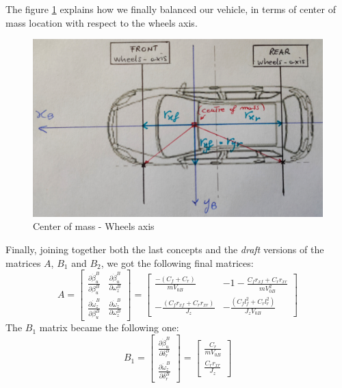 	The figure \ref{VehicleScheme} explains how we finally balanced our vehicle, in terms of center of mass location with respect to the wheels axis.
	\begin{figure} 
		\centering
		\includegraphics[scale=0.1]{../Images/LinSyst/SchemaAssi}
		\caption{Center of mass - Wheels axis}
		\label{VehicleScheme}
	\end{figure}
\newpage
	Finally, joining together both the last concepts and the \textit{draft} versions of the matrices $A$, $B_{1}$ and $B_{2}$, we got the following final matrices:
\begin{equation}
	A=
	\begin{bmatrix}
		\frac{\partial\dot{\beta}_{u}^{B}}{\partial\beta_{u}^{B}} & \frac{\partial\dot{\beta}_{u}^{B}}{\partial\omega_{z}^{B}} \\
		\frac{\partial\dot{\omega}_{z}^{B}}{\partial\beta_{u}^{B}} & \frac{\partial\dot{\omega}_{z}^{B}}{\partial\omega_{z}^{B}}
	\end{bmatrix} = 
	\begin{bmatrix}
		\frac{-(C_{f} + C_{r})}{mV_{0B}} & -1 -\frac{C_{f}r_{xf} + C_{r}r_{xr}}{m V_{0B}^{2}} \\ 
		-\frac{(C_{f}r_{xf} + C_{r}r_{xr})}{J_{z}} & -\frac{(C_{f}l_{f}^{2} + C_{r}l_{r}^{2})}{J_{z} V_{0B}}
	\end{bmatrix}
\end{equation}
The $B_{1}$ matrix became the following one:
\begin{equation} 
B_{1}=
\begin{bmatrix} 
\frac{\partial\dot{\beta}_{u}^{B}}{\partial\delta_{r}^{B}} \\
\frac{\partial\dot{\omega}_{z}^{B}}{\partial\delta_{r}^{B}}
\end{bmatrix} =
\begin{bmatrix} 
\frac{C_{r}}{m V_{0B}} \\ \frac{C_{r}r_{xr}}{J_{z}}
\end{bmatrix} 
\end{equation}
